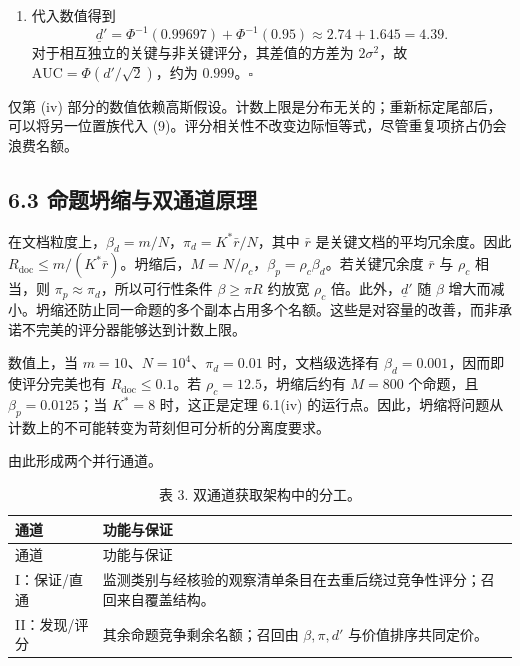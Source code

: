 \documentclass[
  chinese,
  11pt]{article}
\providecommand{\tightlist}{%
  \setlength{\itemsep}{0pt}\setlength{\parskip}{0pt}}
\begin{document}
\begin{enumerate}
\def\labelenumi{(\roman{enumi})}
\setcounter{enumi}{3}
\tightlist
\item
  代入数值得到 \[
  \underline d'=\Phi^{-1}(0.99697)+\Phi^{-1}(0.95)
  \approx2.74+1.645=4.39.
  \] 对于相互独立的关键与非关键评分，其差值的方差为 \(2\sigma^2\)，故 \(\mathrm{AUC}=\Phi(d'/\sqrt2)\)，约为 \(0.999\)。\(\square\)
\end{enumerate}

仅第 (iv) 部分的数值依赖高斯假设。计数上限是分布无关的；重新标定尾部后，可以将另一位置族代入 (9)。评分相关性不改变边际恒等式，尽管重复项挤占仍会浪费名额。

\subsection{6.3 命题坍缩与双通道原理}\label{ux547dux9898ux574dux7f29ux4e0eux53ccux901aux9053ux539fux7406}

在文档粒度上，\(\beta_d=m/N\)，\(\pi_d=K^*\bar r/N\)，其中 \(\bar r\) 是关键文档的平均冗余度。因此 \(R_{\mathrm{doc}}\leq m/(K^*\bar r)\)。坍缩后，\(M=N/\rho_c\)，\(\beta_p=\rho_c\beta_d\)。若关键冗余度 \(\bar r\) 与 \(\rho_c\) 相当，则 \(\pi_p\approx\pi_d\)，所以可行性条件 \(\beta\geq\pi R\) 约放宽 \(\rho_c\) 倍。此外，\(\underline d'\) 随 \(\beta\) 增大而减小。坍缩还防止同一命题的多个副本占用多个名额。这些是对容量的改善，而非承诺不完美的评分器能够达到计数上限。

数值上，当 \(m=10\)、\(N=10^4\)、\(\pi_d=0.01\) 时，文档级选择有 \(\beta_d=0.001\)，因而即使评分完美也有 \(R_{\mathrm{doc}}\leq0.1\)。若 \(\rho_c=12.5\)，坍缩后约有 \(M=800\) 个命题，且 \(\beta_p=0.0125\)；当 \(K^*=8\) 时，这正是定理 6.1(iv) 的运行点。因此，坍缩将问题从计数上的不可能转变为苛刻但可分析的分离度要求。

由此形成两个并行通道。

\begin{longtable}[]{@{}
  >{\raggedright\arraybackslash}p{}
  >{\raggedright\arraybackslash}p{}@{}}
\caption{表 3. 双通道获取架构中的分工。}\tabularnewline
\toprule\noalign{}
\begin{minipage}[b]{\linewidth}\raggedright
通道
\end{minipage} & \begin{minipage}[b]{\linewidth}\raggedright
功能与保证
\end{minipage} \\
\midrule\noalign{}
\endfirsthead
\toprule\noalign{}
\begin{minipage}[b]{\linewidth}\raggedright
通道
\end{minipage} & \begin{minipage}[b]{\linewidth}\raggedright
功能与保证
\end{minipage} \\
\midrule\noalign{}
\endhead
\bottomrule\noalign{}
\endlastfoot
I：保证/直通 & 监测类别与经核验的观察清单条目在去重后绕过竞争性评分；召回来自覆盖结构。 \\
II：发现/评分 & 其余命题竞争剩余名额；召回由 \(\beta,\pi,d'\) 与价值排序共同定价。 \\
\end{longtable}
\end{document}
